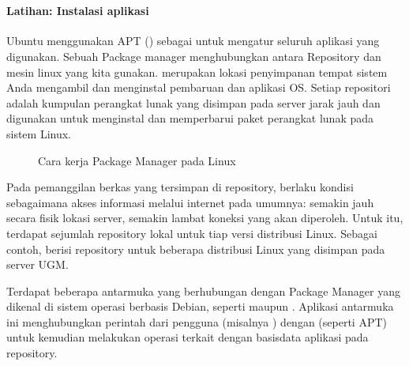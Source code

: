 \documentclass[letterpaper,10pt,english]{sphinxmanual}
\begin{document}
 


\paragraph{Latihan: Instalasi aplikasi}
\label{\detokenize{sesi1/arsitektur:latihan-instalasi-aplikasi}}
Ubuntu menggunakan APT () sebagai  untuk mengatur seluruh aplikasi yang digunakan. Sebuah Package manager menghubungkan antara Repository dan mesin linux yang kita gunakan.  merupakan lokasi penyimpanan tempat sistem Anda mengambil dan menginstal pembaruan dan aplikasi OS. Setiap repositori adalah kumpulan perangkat lunak yang disimpan pada server jarak jauh dan digunakan untuk menginstal dan memperbarui paket perangkat lunak pada sistem Linux.

\begin{figure}[htbp]
\centering
\capstart

\noindent{}
\caption{Cara kerja Package Manager pada Linux}\label{\detokenize{sesi1/arsitektur:apt}}\end{figure}

Pada pemanggilan berkas yang tersimpan di repository, berlaku kondisi sebagaimana akses informasi melalui internet pada umumnya: semakin jauh secara fisik lokasi server, semakin lambat koneksi yang akan diperoleh. Untuk itu, terdapat sejumlah repository lokal untuk tiap versi distribusi Linux. Sebagai contoh,  berisi repository untuk beberapa distribusi Linux yang disimpan pada server UGM.

Terdapat beberapa antarmuka yang berhubungan dengan Package Manager yang dikenal di sistem operasi berbasis Debian, seperti  maupun . Aplikasi antarmuka ini menghubungkan perintah dari pengguna (misalnya ) dengan  (seperti APT) untuk kemudian melakukan operasi terkait dengan basisdata aplikasi pada repository.
\end{document}
